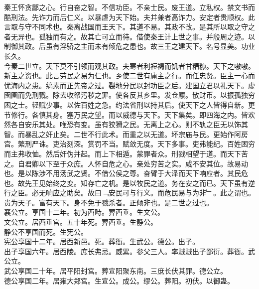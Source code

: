 \documentclass{zhvt-classic}
\begin{document}
\hspace*{2em}秦王怀贪鄙之心。行自奋之智。不信功臣。不亲士民。废王道。立私权。禁文书而酷刑法。先诈力而后仁义。以暴虐为天下始。夫并兼者高诈力。安定者贵顺权。此言取与守不同术也。秦离战国而王天下。其道不易。其政不改。是其所以取之守之者无异也。孤独而有之。故其亡可立而待。借使秦王计上世之事。并殷周之迹。以制御其政。后虽有淫骄之主而未有倾危之患也。故三王之建天下。名号显美。功业长久。\\
\hspace*{2em}今秦二世立。天下莫不引领而观其政。夫寒者利裋褐而饥者甘糟糠。天下之嗷嗷。新主之资也。此言劳民之易为仁也。乡使二世有庸主之行。而任忠贤。臣主一心而忧海内之患。缟素而正先帝之过。裂地分民以封功臣之后。建国立君以礼天下。虚囹圉而免刑戮。除去收帑污秽之罪。使各反其乡里。发仓廪。散财币。以振孤独穷困之士。轻赋少事。以佐百姓之急。约法省刑以持其后。使天下之人皆得自新。更节修行。各慎其身。塞万民之望。而以威德与天下。天下集矣。即四海之内。皆欢然各自安乐其处。唯恐有变。虽有狡猾之民。无离上之心。则不轨之臣无以饰其智。而暴乱之奸止矣。二世不行此术。而重之以无道。坏宗庙与民。更始作阿房宫。繁刑严诛。吏治刻深。赏罚不当。赋敛无度。天下多事。吏弗能纪。百姓困穷而主弗收恤。然后奸伪并起。而上下相遁。蒙罪者众。刑戮相望于道。而天下苦之。自君卿以下至于众庶。人怀自危之心。亲处穷苦之实。咸不安其位。故易动也。是以陈涉不用汤武之贤。不借公侯之尊。奋臂于大泽而天下响应者。其民危也。故先王见始终之变。知存亡之机。是以牧民之道。务在安之而已。天下虽有逆行之臣。必无响应之助矣。故曰﹁安民可与行义。而危民易与为非﹂。此之谓也。贵为天子。富有天下。身不免于戮杀者。正倾非也。是二世之过也。\\
\hspace*{2em}襄公立。享国十二年。初为西畤。葬西垂。生文公。\\
\hspace*{2em}文公立。居西垂宫。五十年死。葬西垂。生静公。\\
\hspace*{2em}静公不享国而死。生宪公。\\
\hspace*{2em}宪公享国十二年。居西新邑。死。葬衙。生武公。德公。出子。\\
\hspace*{2em}出子享国六年。居西陵。庶长弗忌。威累。参父三人。率贼贼出子鄙衍。葬衙。武公立。\\
\hspace*{2em}武公享国二十年。居平阳封宫。葬宣阳聚东南。三庶长伏其罪。德公立。\\
\hspace*{2em}德公享国二年。居雍大郑宫。生宣公。成公。缪公。葬阳。初伏。以御蛊。\\
\end{document}
